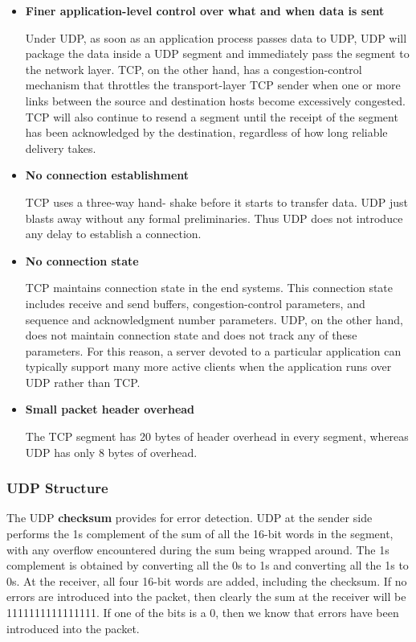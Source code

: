 \documentclass[11pt]{article}
\begin{document}
\begin{itemize}
	\item \textbf{Finer application-level control over what and when data is sent}
	
	Under UDP, as soon as an application process passes data to UDP, UDP will package the data inside a UDP segment and immediately pass the segment to the network layer. TCP, on the other hand, has a congestion-control mechanism that throttles the transport-layer TCP sender when one or more links between the source and destination hosts become excessively congested. TCP will also continue to resend a segment until the receipt of the segment has been acknowledged by the destination, regardless of how long reliable delivery takes.
	
	\item \textbf{No connection establishment}
	
	TCP uses a three-way hand- shake before it starts to transfer data. UDP just blasts away without any formal preliminaries. Thus UDP does not introduce any delay to establish a connection.
	
	\item \textbf{No connection state}
	
	TCP maintains connection state in the end systems. This connection state includes receive and send buffers, congestion-control parameters, and sequence and acknowledgment number parameters. UDP, on the other hand, does not maintain connection state and does not track any of these parameters. For this reason, a server devoted to a particular application can typically support many more active clients when the application runs over UDP rather than TCP.
	
	\item \textbf{Small packet header overhead}
	
	The TCP segment has 20 bytes of header overhead in every segment, whereas UDP has only 8 bytes of overhead.
\end{itemize}

\subsubsection{UDP Structure}

The UDP \textbf{checksum} provides for error detection. UDP at the sender side performs the 1s complement of the sum of all the 16-bit words in the segment, with any overflow encountered during the sum being wrapped around. The 1s complement is obtained by converting all the 0s to 1s and converting all the 1s to 0s. At the receiver, all four 16-bit words are added, including the checksum. If no errors are introduced into the packet, then clearly the sum at the receiver will be 1111111111111111. If one of the bits is a 0, then we know that errors have been introduced into the packet.
\end{document}
